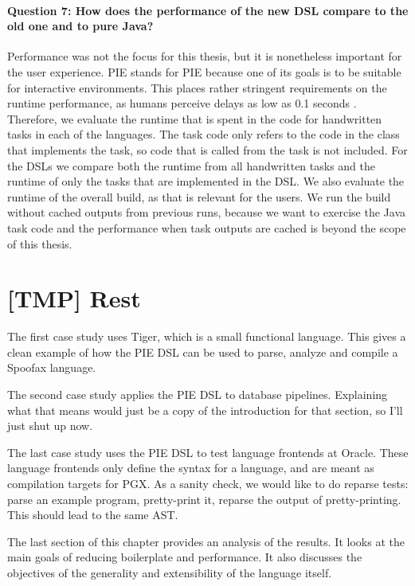 \paragraph{Question 7: How does the performance of the new \ac{DSL} compare to the old one and to pure Java?}
Performance was not the focus for this thesis, but it is nonetheless important for the user experience.
\Ac{PIE} stands for \acl{PIE} because one of its goals is to be suitable for interactive environments.
This places rather stringent requirements on the runtime performance, as humans perceive delays as low as 0.1 seconds \missingref.
Therefore, we evaluate the runtime that is spent in the code for handwritten tasks in each of the languages.
The task code only refers to the code in the class that implements the task, so code that is called from the task is not included.
For the \acp{DSL} we compare both the runtime from all handwritten tasks and the runtime of only the tasks that are implemented in the \ac{DSL}.
We also evaluate the runtime of the overall build, as that is relevant for the users.
We run the build without cached outputs from previous runs, because we want to exercise the Java task code and the performance when task outputs are cached is beyond the scope of this thesis.




\section{[TMP] Rest}

The first case study uses Tiger, which is a small functional language.
This gives a clean example of how the PIE DSL can be used to parse, analyze and compile a Spoofax language.

The second case study applies the \ac{PIE} \ac{DSL} to database pipelines.
Explaining what that means would just be a copy of the introduction for that section, so I'll just shut up now.

The last case study uses the \ac{PIE} \ac{DSL} to test language frontends at Oracle.
These language frontends only define the syntax for a language, and are meant as compilation targets for PGX.
As a sanity check, we would like to do reparse tests: parse an example program, pretty-print it, reparse the output of pretty-printing.
This should lead to the same AST.

The last section of this chapter provides an analysis of the results.
It looks at the main goals of reducing boilerplate and performance.
It also discusses the objectives of the generality and extensibility of the language itself.


